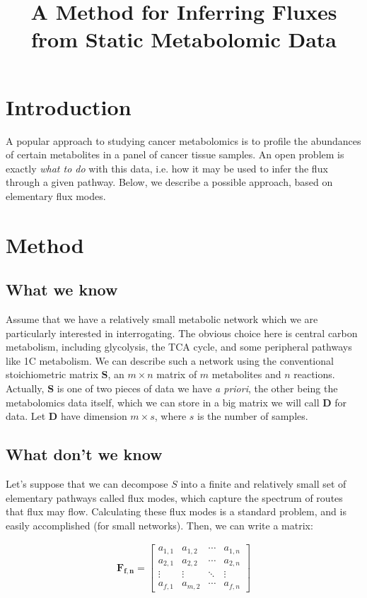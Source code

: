\documentclass[10pt]{article}
\title{A Method for Inferring Fluxes from Static Metabolomic Data}
\begin{document}
\section*{Introduction}
A popular approach to studying cancer metabolomics is to profile the abundances of certain metabolites in a panel of cancer tissue samples. An open problem is exactly \textit{what to do} with this data, i.e. how it may be used to infer the flux through a given pathway. Below, we describe a possible approach, based on elementary flux modes.

\section*{Method}
\subsection*{What we know}
Assume that we have a relatively small metabolic network which we are particularly interested in interrogating. The obvious choice here is central carbon metabolism, including glycolysis, the TCA cycle, and some peripheral pathways like 1C metabolism. We can describe such a network using the conventional stoichiometric matrix $\mathbf{S}$, an $m \times n$ matrix of $m$ metabolites and $n$ reactions. Actually, $\mathbf{S}$ is one of two pieces of data we have \textit{a priori}, the other being the metabolomics data itself, which we can store in a big matrix we will call $\mathbf{D}$ for data. Let $\mathbf{D}$ have dimension $m \times s$, where $s$ is the number of samples.

\subsection*{What don't we know}
Let's suppose that we can decompose $S$ into a finite and relatively small set of elementary pathways called flux modes, which capture the spectrum of routes that flux may flow. Calculating these flux modes is a standard problem, and is easily accomplished (for small networks). Then, we can write a matrix:

\begin{align*}
\mathbf{F_{f,n}} =  \begin{bmatrix}
  a_{1,1} & a_{1,2} & \cdots & a_{1,n} \\
  a_{2,1} & a_{2,2} & \cdots & a_{2,n} \\
  \vdots  & \vdots  & \ddots & \vdots  \\
  a_{f,1} & a_{m,2} & \cdots & a_{f,n}
 \end{bmatrix}
\end{align*}
\end{document}
